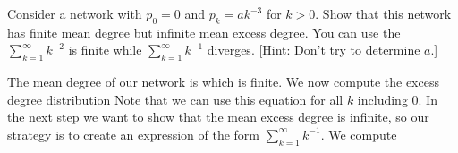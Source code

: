 Consider a network with $p_0=0$ and $p_k=a k^{-3}$ for $k>0$. Show that this network has finite mean degree but infinite mean excess degree. You can use the $\sum_{k=1}^\infty k^{-2}$ is finite while $\sum_{k=1}^\infty k^{-1}$ diverges. [Hint: Don't try to determine $a$.]

\solution
The mean degree of our network is 
which is finite. We now compute the excess degree distribution 
Note that we can use this equation for all $k$ including 0.  
In the next step we want to show that the mean excess degree is infinite, so our strategy is to create an expression of the form $\sum_{k=1}^\infty k^{-1}$. We compute
